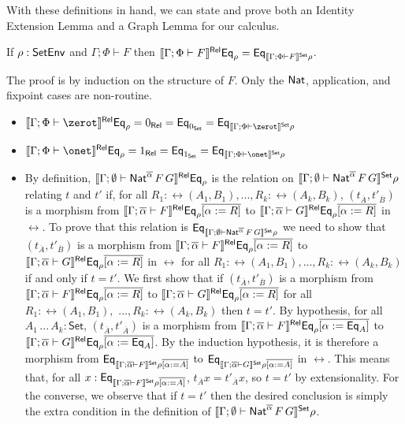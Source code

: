 \documentclass{lmcs}
\theoremstyle{plain}\newtheorem{satz}[thm]{Satz}
\newcommand{\set}{\mathsf{Set}}
\begin{document}
{With these definitions in hand, we can state and prove both an
Identity Extension Lemma and a Graph Lemma for our calculus.
\begin{thm}[IEL]\label{thm:iel}
If $\rho : \mathsf{SetEnv}$ and $\Gamma; \Phi \vdash F$ then $\relsem{\Gamma;
  \Phi \vdash F} \Eq_\rho = \Eq_{\setsem{\Gamma; \Phi \vdash F}\rho}$.
\end{thm}
\proof
The proof is by induction on the structure of $F$. Only the $\mathsf{Nat}$,
application, and fixpoint cases are non-routine.
\begin{itemize}
\item $\relsem{\Gamma; \Phi \vdash \zerot} \Eq_{\rho} = 0_\rel =
  \Eq_{0_\set} = \Eq_{\setsem{\Gamma; \Phi \vdash \zerot}\rho}$
\item $\relsem{\Gamma; \Phi \vdash \onet} \Eq_{\rho} = 1_\rel =
  \Eq_{1_\set} = \Eq_{\setsem{\Gamma; \Phi \vdash \onet}\rho}$
\item By definition, $\llbracket{\Gamma; \emptyset \vdash
  \mathsf{Nat}^{\overline\alpha} \,F\,G}\rrbracket^{\mathsf{Rel}} \mathsf{Eq}_{\rho}$ is the relation on
  $\setsem{\Gamma; \emptyset \vdash \Nat^{\overline\alpha} \,F\,G}
  \rho$ relating $t$ and $t'$ if, for all ${R_1 :
    \rel(A_1,B_1)},...,{R_k : \rel(A_k,B_k)}$, $(t_{\overline{A}},
  t'_{\overline{B}})$ is a morphism from $\llbracket{\Gamma;
    \overline\alpha \vdash F}\rrbracket^{\mathsf{Rel}} \mathsf{Eq}_{\rho}\overline{[\alpha := R]}$ to
  $\llbracket{\Gamma ; \overline\alpha \vdash G}\rrbracket^{\mathsf{Rel}}
  \mathsf{Eq}_{\rho}\overline{[\alpha := R]}$ in $\rel$.  To prove that this
  relation is $\Eq_{\setsem{\Gamma; \emptyset \vdash
      \Nat^{\overline\alpha} \,F\,G} \rho}$ we need to show that
  $(t_{\overline{A}}, t'_{\overline{B}})$ is a morphism from
  $\llbracket{\Gamma; \overline\alpha \vdash F}\rrbracket^{\mathsf{Rel}}
  \mathsf{Eq}_{\rho}\overline{[\alpha := R]}$ to $\llbracket{\Gamma ;
    \overline\alpha \vdash G}\rrbracket^{\mathsf{Rel}} \mathsf{Eq}_{\rho}\overline{[\alpha := R]}$ in
  $\rel$ for all ${R_1 : \rel(A_1,B_1)},...,{R_k : \rel(A_k,B_k)}$ if
  and only if $t = t'$.  We first show that if $(t_{\overline{A}},
  t'_{\overline{B}})$ is a morphism from $\llbracket{\Gamma;
    \overline\alpha \vdash F}\rrbracket^{\mathsf{Rel}} \mathsf{Eq}_{\rho}\overline{[\alpha := R]}$ to
  $\llbracket{\Gamma ; \overline\alpha \vdash G}\rrbracket^{\mathsf{Rel}}
  \mathsf{Eq}_{\rho}\overline{[\alpha := R]}$ for all ${R_1 : \rel(A_1,B_1),}$
  $...,{R_k : \rel(A_k,B_k)}$ then $t = t'$.  By hypothesis, for all
  $A_1\,...\,A_k : \set$, $(t_{\overline{A}}, t'_{\overline{A}})$ is a
  morphism from $\llbracket{\Gamma; \overline\alpha \vdash F}\rrbracket^{\mathsf{Rel}}
  \mathsf{Eq}_{\rho}\overline{[\alpha := \mathsf{Eq}_{A}]}$ to $\llbracket{\Gamma ;
    \overline\alpha \vdash G}\rrbracket^{\mathsf{Rel}} \mathsf{Eq}_{\rho}\overline{[\alpha :=
      \mathsf{Eq}_{A}]}$. By the induction hypothesis, it is therefore a
  morphism from $\Eq_{\setsem{\Gamma; \overline\alpha \vdash F}
    \rho\overline{[\alpha := A]}}$ to $\Eq_{\setsem{\Gamma;
      \overline\alpha \vdash G} \rho\overline{[\alpha := A]}}$ in
  $\rel$. This means that, for all $x : \Eq_{\setsem{\Gamma;
      \overline\alpha \vdash F} \rho\overline{[\alpha := A]}}$,
  $t_{\overline{A}}x = t'_{\overline{A}}x$, so $t = t'$ by
  extensionality. For the converse, we observe that if $t = t'$ then
  the desired conclusion is simply the extra condition in the
  definition of $\setsem{\Gamma;\emptyset \vdash
    \Nat^{\overline\alpha} \,F\,G} \rho$.
 

\end{itemize}}
\end{document}

